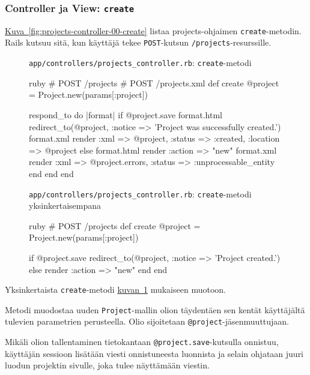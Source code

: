 \documentclass{article}
\newenvironment{myfigure}[1][tbp]{
  \begin{figure}[#1]
    \centering
    \begin{lrbox}{\myfigurebox}
      \begin{minipage}{\textwidth}
}{
      \end{minipage}
    \end{lrbox}
    \colorbox{blue!4}{\usebox{\myfigurebox}}
  \end{figure}
}
\newcommand{\myref}[2]{\hyperref[#2]{#1~\ref*{#2}}}
\newcommand{\pdfforeignlanguage}[2]{\texorpdfstring{\foreignlanguage{#1}{#2}}{#2}}
\newcommand{\eng}[1]{\pdfforeignlanguage{english}{#1}}
\begin{document}
\subsubsection{\eng{Controller} ja \eng{View}: \texttt{create}}

\begin{samepage}
\myref{Kuva}{fig:projects-controller-00-create} listaa projects-ohjaimen
\texttt{create}-metodin. Rails kutsuu sitä, kun käyttäjä tekee
\texttt{POST}-kutsun \texttt{/projects}-resurssille.

\begin{myfigure}[H]
\caption{\texttt{app/controllers/projects\_controller.rb}:
\texttt{create}-metodi}
\label{fig:projects-controller-00-create}

\begin{pygmented}{ruby}
  # POST /projects
  # POST /projects.xml
  def create
    @project = Project.new(params[:project])

    respond_to do |format|
      if @project.save
        format.html { redirect_to(@project, :notice => 'Project was successfully created.') }
        format.xml  { render :xml => @project, :status => :created, :location => @project }
      else
        format.html { render :action => "new" }
        format.xml  { render :xml => @project.errors, :status => :unprocessable_entity }
      end
    end
  end
\end{pygmented}

\caption{\texttt{app/controllers/projects\_controller.rb}:
\texttt{create}-metodi yksinkertaisempana}
\label{fig:projects-controller-01-create}

\begin{pygmented}{ruby}
  # POST /projects
  def create
    @project = Project.new(params[:project])

    if @project.save
      redirect_to(@project, :notice => 'Project created.')
    else
      render :action => "new"
    end
  end
\end{pygmented}
\end{myfigure}
\end{samepage}

Yksinkertaista \texttt{create}-metodi
\myref{kuvan}{fig:projects-controller-01-create} mukaiseen muotoon.

Metodi muodostaa uuden \texttt{Project}-mallin olion täydentäen sen kentät
käyttäjältä tulevien parametrien perusteella. Olio sijoitetaan
\texttt{@project}-jäsenmuuttujaan.

Mikäli olion tallentaminen tietokantaan \texttt{@project.save}-kutsulla
onnistuu, käyttäjän sessioon lisätään viesti onnistuneesta luonnista ja selain
ohjataan juuri luodun projektin sivulle, joka tulee näyttämään viestin.
\end{document}
